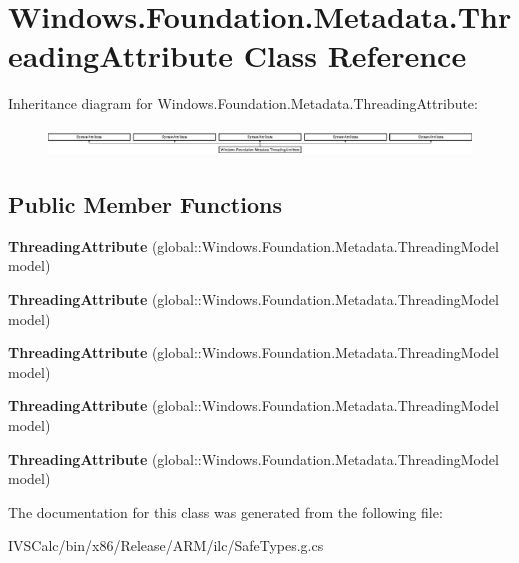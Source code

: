 \hypertarget{class_windows_1_1_foundation_1_1_metadata_1_1_threading_attribute}{}\section{Windows.\+Foundation.\+Metadata.\+Threading\+Attribute Class Reference}
\label{class_windows_1_1_foundation_1_1_metadata_1_1_threading_attribute}
Inheritance diagram for Windows.\+Foundation.\+Metadata.\+Threading\+Attribute\+:\begin{figure}[H]
\begin{center}
\leavevmode
\includegraphics[height=0.744186cm]{class_windows_1_1_foundation_1_1_metadata_1_1_threading_attribute}
\end{center}
\end{figure}
\subsection*{Public Member Functions}
\begin{DoxyCompactItemize}
\item 
\mbox{\label{class_windows_1_1_foundation_1_1_metadata_1_1_threading_attribute_a3c9b2d707d4ea7c576c7c972b8165b6e}} 
{\bfseries Threading\+Attribute} (global\+::\+Windows.\+Foundation.\+Metadata.\+Threading\+Model model)
\item 
\mbox{\label{class_windows_1_1_foundation_1_1_metadata_1_1_threading_attribute_a3c9b2d707d4ea7c576c7c972b8165b6e}} 
{\bfseries Threading\+Attribute} (global\+::\+Windows.\+Foundation.\+Metadata.\+Threading\+Model model)
\item 
\mbox{\label{class_windows_1_1_foundation_1_1_metadata_1_1_threading_attribute_a3c9b2d707d4ea7c576c7c972b8165b6e}} 
{\bfseries Threading\+Attribute} (global\+::\+Windows.\+Foundation.\+Metadata.\+Threading\+Model model)
\item 
\mbox{\label{class_windows_1_1_foundation_1_1_metadata_1_1_threading_attribute_a3c9b2d707d4ea7c576c7c972b8165b6e}} 
{\bfseries Threading\+Attribute} (global\+::\+Windows.\+Foundation.\+Metadata.\+Threading\+Model model)
\item 
\mbox{\label{class_windows_1_1_foundation_1_1_metadata_1_1_threading_attribute_a3c9b2d707d4ea7c576c7c972b8165b6e}} 
{\bfseries Threading\+Attribute} (global\+::\+Windows.\+Foundation.\+Metadata.\+Threading\+Model model)
\end{DoxyCompactItemize}


The documentation for this class was generated from the following file\+:\begin{DoxyCompactItemize}
\item 
I\+V\+S\+Calc/bin/x86/\+Release/\+A\+R\+M/ilc/Safe\+Types.\+g.\+cs\end{DoxyCompactItemize}
